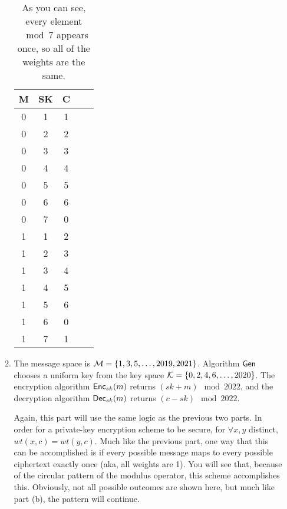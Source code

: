 \documentclass[11pt]{article}
\begin{document}
\begin{enumerate}
\begin{enumerate}
{    \begin{table}[htb]
      \centering
      \caption{As you can see, every element$\mod7$ appears once, so all of the weights are the same.}
      \begin{tabular}{|c|c|c|c|c|}
        \hline
        \bfseries{M} & \bfseries{SK} & \bfseries{C}  \\ \hline
       0 & 1 & 1  \\ \hline
       0 & 2 & 2  \\ \hline
       0 & 3 & 3  \\ \hline
       0 & 4 & 4  \\ \hline
       0 & 5 & 5  \\ \hline
       0 & 6 & 6  \\ \hline
       0 & 7 & 0  \\ \hline
       1 & 1 & 2  \\ \hline
       1 & 2 & 3  \\ \hline
       1 & 3 & 4  \\ \hline
       1 & 4 & 5  \\ \hline
       1 & 5 & 6  \\ \hline
       1 & 6 & 0  \\ \hline
       1 & 7 & 1  \\ \hline
      \end{tabular}
    \end{table}
    }
    \newpage
    \item The message space is ${\mathcal M}=\{1,3,5,\dots,2019,2021\}$. Algorithm $\mathsf{Gen}$ chooses a uniform key from the key space ${\mathcal K} = \{0,2,4,6, \dotsc,2020\}$. The encryption algorithm $\mathsf{Enc}_{sk}(m)$ returns $(sk+m) \mod 2022$, and the decryption algorithm $\mathsf{Dec}_{sk}(m)$ returns $(c-sk) \mod 2022$. \newline
    {\bfseries
    \newline
    \newline

    Again, this part will use the same logic as the previous two parts. In order for a private-key encryption scheme to be secure, for $\forall x,y$ distinct, $wt(x,c) = wt(y,c)$. Much like the previous part, one way that this can be accomplished is if every possible message maps to every possible ciphertext exactly once (aka, all weights are 1). You will see that, because of the circular pattern of the modulus operator, this scheme accomplishes this. Obviously, not all possible outcomes are shown here, but much like part (b), the pattern will continue.
    
}
\end{enumerate}
\end{enumerate}
\end{document}
